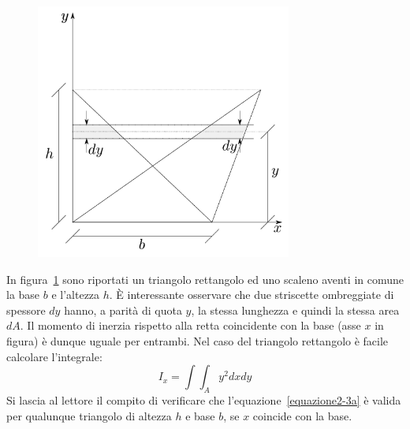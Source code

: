 \begin{figure}[ht]
\centering
\includegraphics[width=0.75\textwidth]{Immagini/Parte_2/Figura2_3/Figura2_3.pdf}
\caption{}
\label{figura2-3}
\end{figure}
\noindent In figura~\ref{figura2-3} sono riportati un triangolo rettangolo ed uno scaleno aventi in comune la base $b$ e l'altezza $h$. È interessante osservare che due striscette ombreggiate di spessore $dy$ hanno, a parità di quota $y$, la stessa lunghezza e quindi la stessa area $dA$. Il momento di inerzia rispetto alla retta coincidente con la base (asse $x$ in figura) è dunque uguale per entrambi. Nel caso del triangolo rettangolo è facile calcolare l'integrale:
\begin{equation*}
I_x = \int\int_A y^{2}dxdy
\end{equation*}
Si lascia al lettore il compito di verificare che l'equazione~\eqref{equazione2-3a} è valida per qualunque triangolo di altezza $h$ e base $b$, se $x$ coincide con la base.

